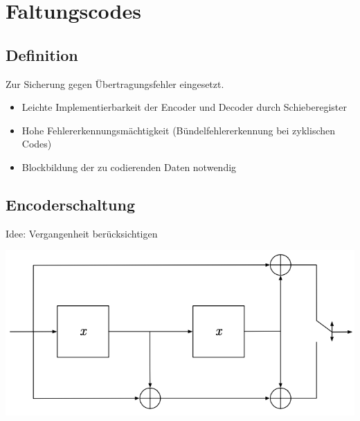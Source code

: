 
\section{Faltungscodes}


\subsection{Definition}
Zur Sicherung gegen Übertragungsfehler eingesetzt.
\begin{itemize}
    \item Leichte Implementierbarkeit der Encoder und Decoder durch Schieberegister
    \item Hohe Fehlererkennungsmächtigkeit (Bündelfehlererkennung bei zyklischen Codes)
    \item Blockbildung der zu codierenden Daten notwendig
\end{itemize}


\subsection{Encoderschaltung}
Idee: Vergangenheit berücksichtigen
\vspace{-8pt}
\begin{center}
    \includegraphics[scale=.33]{graphic/faltungscodes/Encoderschaltung.png}
\end{center}
\vspace{-8pt}


